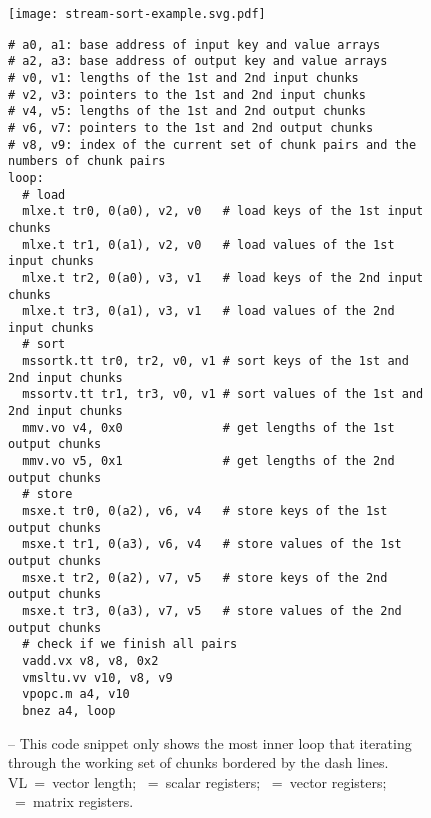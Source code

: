 
\lstset{style=riscv-asm-style}

\begin{figure}[tp]

  \centering
  \texttt{[image: stream-sort-example.svg.pdf]}

\begin{lstlisting}[xleftmargin=0.025\tw]
# a0, a1: base address of input key and value arrays
# a2, a3: base address of output key and value arrays
# v0, v1: lengths of the 1st and 2nd input chunks
# v2, v3: pointers to the 1st and 2nd input chunks
# v4, v5: lengths of the 1st and 2nd output chunks
# v6, v7: pointers to the 1st and 2nd output chunks
# v8, v9: index of the current set of chunk pairs and the numbers of chunk pairs
loop:
  # load
  mlxe.t tr0, 0(a0), v2, v0   # load keys of the 1st input chunks
  mlxe.t tr1, 0(a1), v2, v0   # load values of the 1st input chunks
  mlxe.t tr2, 0(a0), v3, v1   # load keys of the 2nd input chunks
  mlxe.t tr3, 0(a1), v3, v1   # load values of the 2nd input chunks
  # sort
  mssortk.tt tr0, tr2, v0, v1 # sort keys of the 1st and 2nd input chunks
  mssortv.tt tr1, tr3, v0, v1 # sort values of the 1st and 2nd input chunks
  mmv.vo v4, 0x0              # get lengths of the 1st output chunks
  mmv.vo v5, 0x1              # get lengths of the 2nd output chunks
  # store
  msxe.t tr0, 0(a2), v6, v4   # store keys of the 1st output chunks
  msxe.t tr1, 0(a3), v6, v4   # store values of the 1st output chunks
  msxe.t tr2, 0(a2), v7, v5   # store keys of the 2nd output chunks
  msxe.t tr3, 0(a3), v7, v5   # store values of the 2nd output chunks
  # check if we finish all pairs
  vadd.vx v8, v8, 0x2
  vmsltu.vv v10, v8, v9
  vpopc.m a4, v10
  bnez a4, loop
\end{lstlisting}

\caption[Sorting Chunks of Keys and Values from Multiple Streams in Parallel]{
   --
  This code snippet only shows the most inner loop that iterating through the
  working set of chunks bordered by the dash lines.
  VL~=~vector length;
  ~=~scalar registers;
  ~=~vector registers;
  ~=~matrix registers.
}
\label{fig-spz-mssort-code}
\end{figure}
